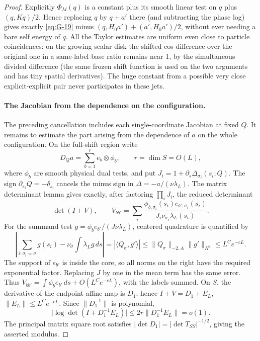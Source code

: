 \begin{proof}
Explicitly \(\Phi_M(q)\) is a constant plus its smooth linear test on \(q\) plus \((q,K q)/2\). Hence replacing \(q\) by \(q+a'\) there (and subtracting the phase log) gives exactly \eqref{eq:G-19} minus \((q,H_0 a')+(a',H_0 a')/2\), without ever needing a bare self energy of \(q\). All the Taylor estimates are uniform even close to particle coincidences: on the growing scalar disk the shifted cos-difference over the original one in a same-label base ratio remains near 1, by the simultaneous divided difference (the same frozen shift function is used on the two arguments and has tiny spatial derivatives). The huge constant from a possible very close explicit-explicit pair never participates in these jets.

\paragraph{The Jacobian from the dependence on the configuration.}
The preceding cancellation includes each single-coordinate Jacobian at
fixed \(Q\). It remains to estimate the part arising from
the dependence of \(a\) on the whole configuration. On the full-shift
region write
\[
 D_Qa=\sum_{b=1}^{r}e_b\otimes\phi_b,\qquad r=\dim S=O(L),
\]
where \(\phi_b\) are smooth physical dual tests, and put
\(J_i=1+\partial_s\Delta_{\sigma_i}(s_i;Q)\). The sign
\(\partial_{s_i}Q=-\delta_{s_i}\) cancels the minus sign in
\(\Delta=-a/(\nu\lambda_L)\). The matrix determinant lemma gives
exactly, after factoring \(\prod_iJ_i\), the reduced determinant
\[
 \det(I+V),\qquad
 V_{bb'}=\sum_i
 \frac{\phi_{b,\sigma_i}(s_i)e_{b',\sigma_i}(s_i)}
      {J_i\nu_{\sigma_i}\lambda_L(s_i)}.
\]
For the summand test \(g=\phi_b e_{b'}/(J\nu\lambda_L)\), centered
quadrature is quantified by
\[
 \left|\sum_{i:\sigma_i=\sigma}g(s_i)
                     -\nu_\sigma\int\lambda_Lg\,ds\right|
 =|\langle Q_\sigma,g'\rangle|
 \le \|Q_\sigma\|_{-2,A}\|g'\|_{H^2}
 \le L^C e^{-cL}.
\]
The support of \(e_{b'}\) is inside the core, so all norms on the
right have the required exponential factor. Replacing \(J\) by one
in the mean term has the same error. Thus
\(V_{bb'}=\int\phi_b e_{b'}\,ds+O(L^Ce^{-cL})\), with the
labels summed. On \(S\), the derivative of the endpoint affine map
is \(D_1\); hence \(I+V=D_1+E_L\),
\(\|E_L\|\le L^Ce^{-cL}\). Since \(\|D_1^{-1}\|\) is polynomial,
\[
 \big|\log\det(I+D_1^{-1}E_L)\big|
 \le 2r\|D_1^{-1}E_L\|=o(1).
\]
The principal matrix square root satisfies
\(|\det D_1|=|\det T_{SS}|^{-1/2}\), giving the asserted modulus.


\end{proof}
